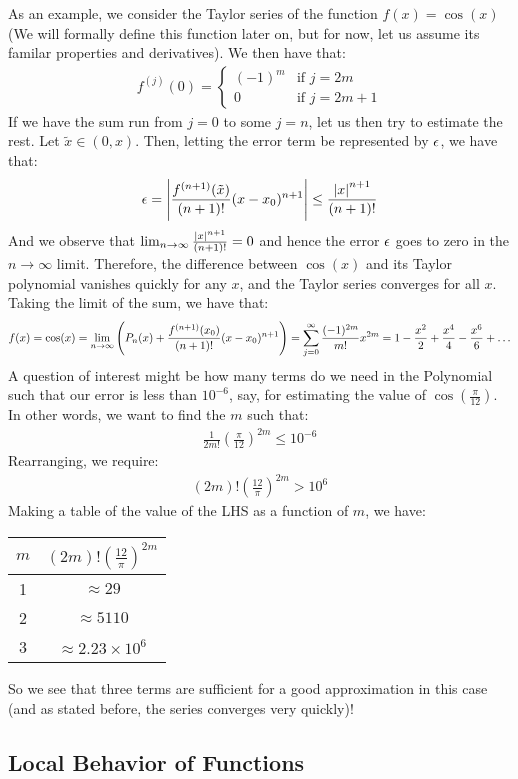 \noindent As an example, we consider the Taylor series of the function $f(x) = \cos(x)$ (We will formally define this function later on, but for now, let us assume its familar properties and derivatives). We then have that:
\begin{align*}
    f^{(j)}(0) = \begin{cases}
        (-1)^m & \text{if $j = 2m$}
        \\ 0 & \text{if $j = 2m + 1$}
    \end{cases}
\end{align*}
If we have the sum run from $j = 0$ to some $j = n$, let us then try to estimate the rest. Let $\tilde{x} \in (0, x)$. Then, letting the error term be represented by $\epsilon$, we have that:
\begin{align*}
    \epsilon = \abs{\frac{f^{(n+1)}(\tilde{x})}{(n+1)!}(x-x_0)^{n+1}} \leq \frac{\abs{x}^{n+1}}{(n+1)!} 
\end{align*}
And we observe that $\lim_{n \rightarrow \infty} \frac{\abs{x}^{n+1}}{(n+1)!} = 0$ and hence the error $\epsilon$ goes to zero in the $n \rightarrow \infty$ limit. Therefore, the difference between $\cos(x)$ and its Taylor polynomial vanishes quickly for any $x$, and the Taylor series converges for all $x$. Taking the limit of the sum, we have that:
\begin{align*}
    f(x) = \cos(x) = \lim_{n \rightarrow \infty} \left(P_{n}(x) + \frac{f^{(n+1)}(x_0)}{(n+1)!}(x - x_0)^{n+1}\right) = \sum_{j=0}^\infty \frac{(-1)^{2m}}{m!}x^{2m} = 1 - \frac{x^2}{2} + \frac{x^4}{4} - \frac{x^6}{6} + \ldots
\end{align*}
A question of interest might be how many terms do we need in the Polynomial such that our error is less than $10^{-6}$, say, for estimating the value of $\cos(\frac{\pi}{12})$. In other words, we want to find the $m$ such that:
\begin{align*}
    \frac{1}{2m!}\left(\frac{\pi}{12}\right)^{2m} \leq 10^{-6}
\end{align*}
Rearranging, we require:
\begin{align*}
    (2m)!\left(\frac{12}{\pi}\right)^{2m} > 10^6
\end{align*}
Making a table of the value of the LHS as a function of $m$, we have:
\begin{table}[htbp]
    \centering\begin{tabular}{c|c}
    $m$ & $(2m)!\left(\frac{12}{\pi}\right)^{2m}$
    \\ \hline
    1 & $\approx 29$
    \\ 2 & $\approx 5110$
    \\ 3 & $\approx 2.23 \times 10^{6}$
    \end{tabular}
\end{table}
So we see that three terms are sufficient for a good approximation in this case (and as stated before, the series converges very quickly)!

\subsection{Local Behavior of Functions}